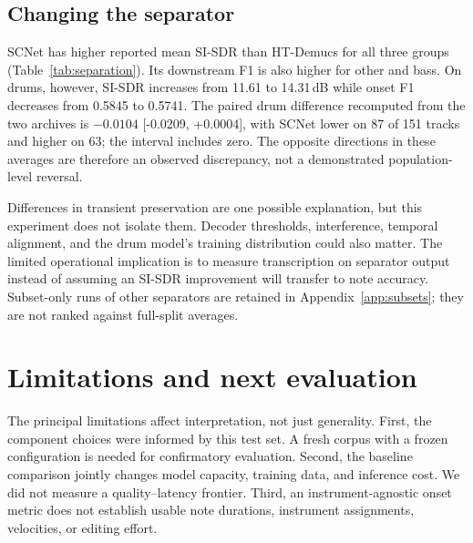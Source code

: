 \documentclass[11pt]{article}
\newcommand{\ci}[2]{{\small[#1, #2]}}
\begin{document}
\subsection{Changing the separator}
\begin{table}[t]
\centering\small
\caption{Reported separator comparison with basic-pitch for pitched groups and
the historical ADTOF port for drums, on the same 151-track test split (143
eligible bass pairs in both archives). Paired differences recomputed from the
per-track archives, SCNet minus HT-Demucs: other $+0.0148$ \ci{+0.0119}{+0.0176},
bass $+0.0490$ \ci{+0.0330}{+0.0656}, drums $-0.0104$ \ci{-0.0209}{+0.0004}.}
\label{tab:separation}

\end{table}
SCNet has higher reported mean SI-SDR than HT-Demucs for all three groups
(Table~\ref{tab:separation}). Its downstream F1 is also higher for other and bass.
On drums, however, SI-SDR increases from 11.61 to 14.31\,dB while onset F1 decreases
from 0.5845 to 0.5741. The paired drum difference recomputed from the two archives
is $-0.0104$ \ci{-0.0209}{+0.0004}, with SCNet lower on 87 of 151 tracks and
higher on 63; the interval includes zero. The opposite directions in these averages
are therefore an observed discrepancy, not a demonstrated population-level reversal.

Differences in transient preservation are one possible explanation, but this
experiment does not isolate them. Decoder thresholds, interference, temporal
alignment, and the drum model's training distribution could also matter. The
limited operational implication is to measure transcription on separator output
instead of assuming an SI-SDR improvement will transfer to note accuracy.
Subset-only runs of other separators are retained in Appendix~\ref{app:subsets};
they are not ranked against full-split averages.

\section{Limitations and next evaluation}
The principal limitations affect interpretation, not just generality. First, the
component choices were informed by this test set. A fresh corpus with a frozen
configuration is needed for confirmatory evaluation. Second, the baseline comparison
jointly changes model capacity, training data, and inference cost. We did not measure
a quality--latency frontier. Third, an instrument-agnostic onset metric does not
establish usable note durations, instrument assignments, velocities, or editing effort.
\end{document}

